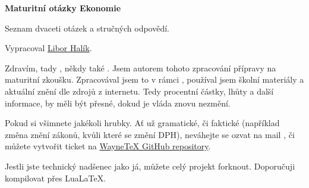 \documentclass[ekobook.tex]{subfiles}
\begin{document}
\vspace*{\fill}
\begin{center}
\begin{minipage}[c]{0.70\textwidth}
{\HUGE\color{WPP}\textbf{Maturitní otázky \colorbox{WPP}{\color{DP}Ekonomie}}}\\
\vspace{0em}%
{\color{WPP}}%
\vspace{0em}\par
\begin{center}
{\large Seznam dvaceti otázek a stručných odpovědí.}\par
{\large Vypracoval \href{https://github.com/ScamanderWayne}{\color{WPP}Libor Halík}}.
\end{center}
\end{minipage}
\end{center}
\vspace*{\fill}
\vspace*{\fill}
\thispagestyle{empty}
\newpage
\vspace*{\fill}    %

\hfill\begin{minipage}{0.6\textwidth}
\raggedleft               %
\parindent=0pt            %
Zdravím, tady , někdy také .
Jsem autorem tohoto zpracování přípravy na maturitní zkoušku.
Zpracovával jsem to v rámci , používal jsem školní materiály a aktuální znění dle zdrojů z internetu.
Tedy procentní částky, lhůty a další informace, by měli být přesné, dokud je vláda znovu nezmění.

\bigskip
Pokud si všimnete jakékoli hrubky.
Ať už gramatické, či faktické (například změna znění zákonů, kvůli které se  změní DPH), neváhejte se ozvat na mail ,
či můžete vytvořit ticket na \href{https://github.com/ScamanderWayne/WayneTeX/issues/new/choose}{\color{WPP}WayneTeX GitHub repository}.

\bigskip
Jestli jste technický nadšenec jako já, můžete celý projekt forknout.
Doporučuji kompilovat přes Lua\LaTeX .
\end{minipage}
\thispagestyle{empty}
\wpage
\renewcommand\contentsname{{\color{WPP}Maturitní otázky{ }}\colorbox{WPP}{\color{DP}Ekonomie}}
\hypertarget{contents}{}
\tableofcontents
\thispagestyle{empty}
\wpage
\end{document}
